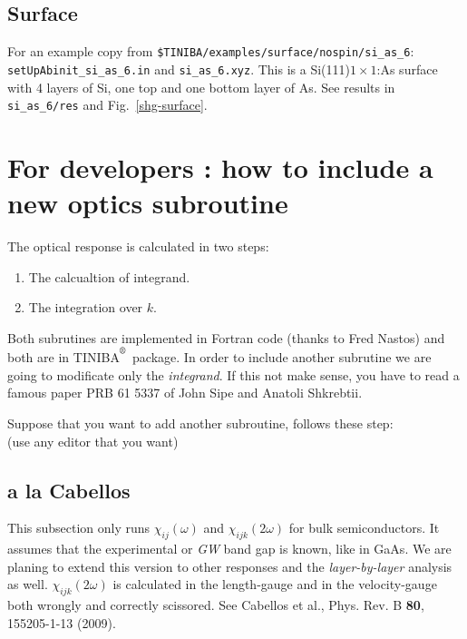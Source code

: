 \documentclass[12pt,leqno]{article}
\def\reg{\textsuperscript{\textregistered}}
\numberwithin{equation}{section}
\begin{document}
\subsection{Surface} 
For an example copy from \verb=$TINIBA/examples/surface/nospin/si_as_6=:\\
\verb=setUpAbinit_si_as_6.in= and \verb=si_as_6.xyz=. This is a
Si(111)$1\times 1$:As surface with 4 layers of Si, one top and one bottom
layer of As. See results in \verb=si_as_6/res= and Fig.~\ref{shg-surface}.

\section{For developers : how to include a new optics subroutine}
The optical response is calculated in two steps:\\
\begin{enumerate}
\item The calcualtion of integrand.
\item The integration over $k$.
\end{enumerate}
Both subrutines are implemented in Fortran code (thanks to Fred Nastos) and both 
are in TINIBA$^\reg$ package. In order to include another subrutine we are going to 
modificate only the 
\emph{integrand}. If this not make sense, you have to read a famous paper 
PRB 61 5337 of John Sipe and  Anatoli Shkrebtii. 
 
Suppose that you want to add another subroutine, follows these step:\\ 
(use any editor that you want)\\

\subsection{a la Cabellos}

This subsection only runs $\chi_{ij}(\omega)$
and $\chi_{ijk}(2\omega)$ for bulk semiconductors. It assumes that the
experimental or {\it GW} band gap is known, like in GaAs.
We are planing to extend this version to other responses and the {\it
  layer-by-layer } analysis as well. $\chi_{ijk}(2\omega)$ is
calculated in the length-gauge  and in the velocity-gauge both wrongly
and correctly scissored. See Cabellos et al., Phys.  Rev. B {\bf 80}, 155205-1-13 (2009).
\end{document}
